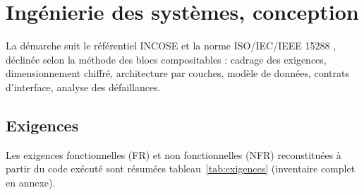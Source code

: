 \documentclass[11pt,a4paper]{article}
\begin{document}
\section{Ingénierie des systèmes, conception}
\label{sec:se}

La démarche suit le référentiel INCOSE \cite{incose2023} et la norme ISO/IEC/IEEE 15288
\cite{iso15288}, déclinée selon la méthode des blocs compositables \cite{systemdesignskills} :
cadrage des exigences, dimensionnement chiffré, architecture par couches, modèle de données, contrats
d'interface, analyse des défaillances.

\subsection{Exigences}
Les exigences fonctionnelles (FR) et non fonctionnelles (NFR) reconstituées à partir du code exécuté sont
résumées tableau~\ref{tab:exigences} (inventaire complet en annexe).
\end{document}
